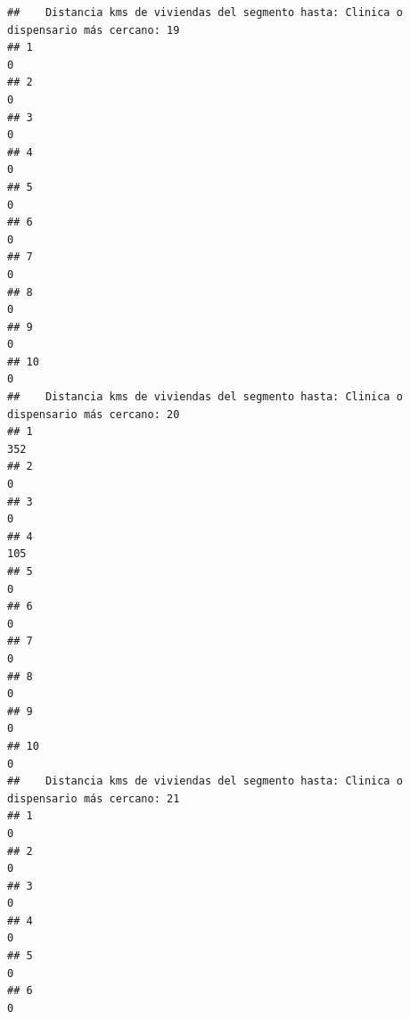 \documentclass[11pt,]{article}
\begin{document}
\begin{verbatim}
##    Distancia kms de viviendas del segmento hasta: Clinica o dispensario más cercano: 19
## 1                                                                                     0
## 2                                                                                     0
## 3                                                                                     0
## 4                                                                                     0
## 5                                                                                     0
## 6                                                                                     0
## 7                                                                                     0
## 8                                                                                     0
## 9                                                                                     0
## 10                                                                                    0
##    Distancia kms de viviendas del segmento hasta: Clinica o dispensario más cercano: 20
## 1                                                                                   352
## 2                                                                                     0
## 3                                                                                     0
## 4                                                                                   105
## 5                                                                                     0
## 6                                                                                     0
## 7                                                                                     0
## 8                                                                                     0
## 9                                                                                     0
## 10                                                                                    0
##    Distancia kms de viviendas del segmento hasta: Clinica o dispensario más cercano: 21
## 1                                                                                     0
## 2                                                                                     0
## 3                                                                                     0
## 4                                                                                     0
## 5                                                                                     0
## 6                                                                                     0

\end{verbatim}
\end{document}
